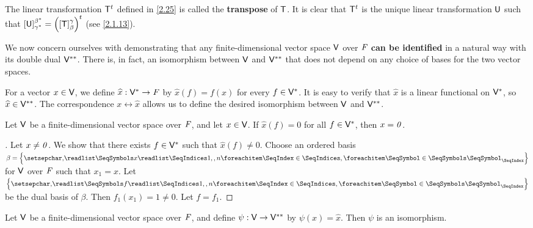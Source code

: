 \begin{note}
  The linear transformation \({\mathsf{T}}^{t}\) defined in \cref{2.25} is called the \textbf{transpose} of \(\mathsf{T}\).
  It is clear that \({\mathsf{T}}^{t}\) is the unique linear transformation \(\mathsf{U}\) such that \([\mathsf{U}]_{\gamma^*}^{\beta^*} = {\left\lparen[\mathsf{T}]_{\beta}^{\gamma}\right\rparen}^{t}\)
  (see \cref{2.1.13}).
\end{note}

\begin{note}
  We now concern ourselves with demonstrating that any finite-dimensional vector space \(\mathsf{V}\) over \(\mathit{F}\) \textbf{can be identified} in a natural way with its double dual \(\mathsf{V}^{**}\).
  There is, in fact, an isomorphism between \(\mathsf{V}\) and \(\mathsf{V}^{**}\) that does not depend on any choice of bases for the two vector spaces.
\end{note}

\begin{defn}\label{2.6.7}
  For a vector \(x \in \mathsf{V}\), we define \(\widehat{x} : \mathsf{V}^* \to \mathit{F}\) by \(\widehat{x}(f) = f(x)\) for every \(f \in \mathsf{V}^*\).
  It is easy to verify that \(\widehat{x}\) is a linear functional on \(\mathsf{V}^*\), so \(\widehat{x} \in \mathsf{V}^{**}\).
  The correspondence \(x \leftrightarrow \widehat{x}\) allows us to define the desired isomorphism between \(\mathsf{V}\) and \(\mathsf{V}^{**}\).
\end{defn}

\begin{lem}\label{2.6.8}
  Let \(\mathsf{V}\) be a finite-dimensional vector space over \(\mathit{F}\), and let \(x \in \mathsf{V}\).
  If \(\widehat{x}(f) = 0\) for all \(f \in \mathsf{V}^*\), then \(x = \mathit{0}\).
\end{lem}

\begin{proof}[]
  Let \(x \neq \mathit{0}\).
  We show that there exists \(f \in \mathsf{V}^*\) such that \(\widehat{x}(f) \neq 0\).
  Choose an ordered basis \(\beta = \set{\seq{x}{1,,n}}\) for \(\mathsf{V}\) over \(\mathit{F}\) such that \(x_1 = x\).
  Let \(\set{\seq{f}{1,,n}}\) be the dual basis of \(\beta\).
  Then \(f_1(x_1) = 1 \neq 0\).
  Let \(f = f_1\).
\end{proof}

\begin{thm}\label{2.26}
  Let \(\mathsf{V}\) be a finite-dimensional vector space over \(\mathit{F}\), and define \(\psi : \mathsf{V} \to \mathsf{V}^{**}\) by \(\psi(x) = \widehat{x}\).
  Then \(\psi\) is an isomorphism.
\end{thm}

